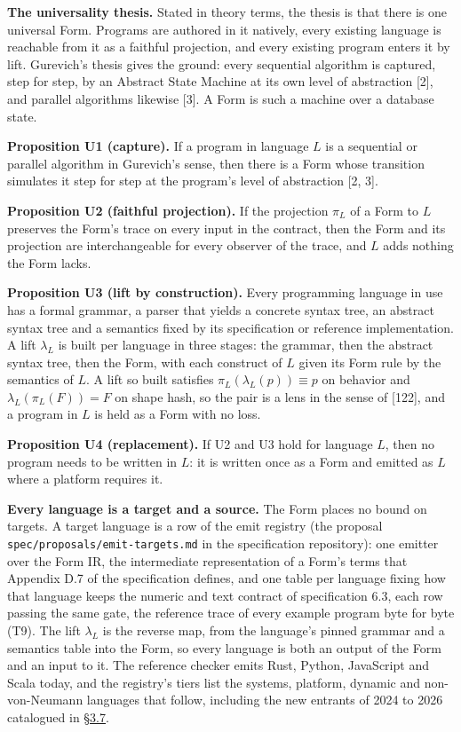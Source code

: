 \documentclass[10pt,letterpaper]{article}
\begin{document}
\textbf{The universality thesis.} Stated in theory terms, the thesis is
that there is one universal Form. Programs are authored in it natively,
every existing language is reachable from it as a faithful projection,
and every existing program enters it by lift. Gurevich's thesis gives
the ground: every sequential algorithm is captured, step for step, by an
Abstract State Machine at its own level of abstraction {[}2{]}, and
parallel algorithms likewise {[}3{]}. A Form is such a machine over a
database state.

\textbf{Proposition U1 (capture).} If a program in language \(L\) is a
sequential or parallel algorithm in Gurevich's sense, then there is a
Form whose transition simulates it step for step at the program's level
of abstraction {[}2, 3{]}.

\textbf{Proposition U2 (faithful projection).} If the projection
\(\pi_L\) of a Form to \(L\) preserves the Form's trace on every input
in the contract, then the Form and its projection are interchangeable
for every observer of the trace, and \(L\) adds nothing the Form lacks.

\textbf{Proposition U3 (lift by construction).} Every programming
language in use has a formal grammar, a parser that yields a concrete
syntax tree, an abstract syntax tree and a semantics fixed by its
specification or reference implementation. A lift \(\lambda_L\) is built
per language in three stages: the grammar, then the abstract syntax
tree, then the Form, with each construct of \(L\) given its Form rule by
the semantics of \(L\). A lift so built satisfies
\(\pi_L(\lambda_L(p)) \equiv p\) on behavior and
\(\lambda_L(\pi_L(F)) = F\) on shape hash, so the pair is a lens in the
sense of {[}122{]}, and a program in \(L\) is held as a Form with no
loss.

\textbf{Proposition U4 (replacement).} If U2 and U3 hold for language
\(L\), then no program needs to be written in \(L\): it is written once
as a Form and emitted as \(L\) where a platform requires it.

\textbf{Every language is a target and a source.} The Form places no
bound on targets. A target language is a row of the emit registry (the
proposal \texttt{spec/\allowbreak{}proposals/\allowbreak{}emit-\allowbreak{}targets.\allowbreak{}md} in the specification
repository): one emitter over the Form IR, the intermediate
representation of a Form's terms that Appendix D.7 of the specification
defines, and one table per language fixing how that language keeps the
numeric and text contract of specification 6.3, each row passing the
same gate, the reference trace of every example program byte for byte
(T9). The lift \(\lambda_L\) is the reverse map, from the language's
pinned grammar and a semantics table into the Form, so every language is
both an output of the Form and an input to it. The reference checker
emits Rust, Python, JavaScript and Scala today, and the registry's tiers
list the systems, platform, dynamic and non-von-Neumann languages that
follow, including the new entrants of 2024 to 2026 catalogued in
\href{https://research.openie.dev/papers/rce/\#37-the-language-one-text-costs-and-theorem-status}{§3.7}.
\end{document}
